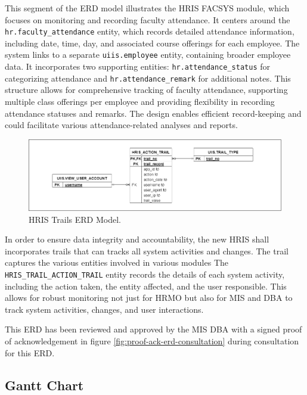     This segment of the ERD model illustrates the HRIS FACSYS module, which focuses on monitoring and recording faculty attendance. It centers around the \texttt{hr.faculty\_attendance} entity, which records detailed attendance information, including date, time, day, and associated course offerings for each employee. The system links to a separate \texttt{uiis.employee} entity, containing broader employee data. It incorporates two supporting entities: \texttt{hr.attendance\_status} for categorizing attendance and \texttt{hr.attendance\_remark} for additional notes. This structure allows for comprehensive tracking of faculty attendance, supporting multiple class offerings per employee and providing flexibility in recording attendance statuses and remarks. The design enables efficient record-keeping and could facilitate various attendance-related analyses and reports.

    \begin{figure}[H]
        \centering
        \includegraphics[width=1\linewidth]{figures/images/diagrams/erd/erd-trails.png}
        \caption{HRIS Trails ERD Model.}
        \label{fig:erd-trails}
    \end{figure}

    In order to ensure data integrity and accountability, the new HRIS shall incorporates trails that can tracks all system activities and changes. The trail captures the various entities involved in various modules The \texttt{HRIS\_TRAIL\_ACTION\_TRAIL} entity records the details of each system activity, including the action taken, the entity affected, and the user responsible. This allows for robust monitoring not just for HRMO but also for MIS and DBA to track system activities, changes, and user interactions. 

    This ERD has been reviewed and approved by the MIS DBA with a signed proof of acknowledgement in figure \ref*{fig:proof-ack-erd-consultation} during consultation for this ERD. 
    
    \subsection{Gantt Chart}
    
